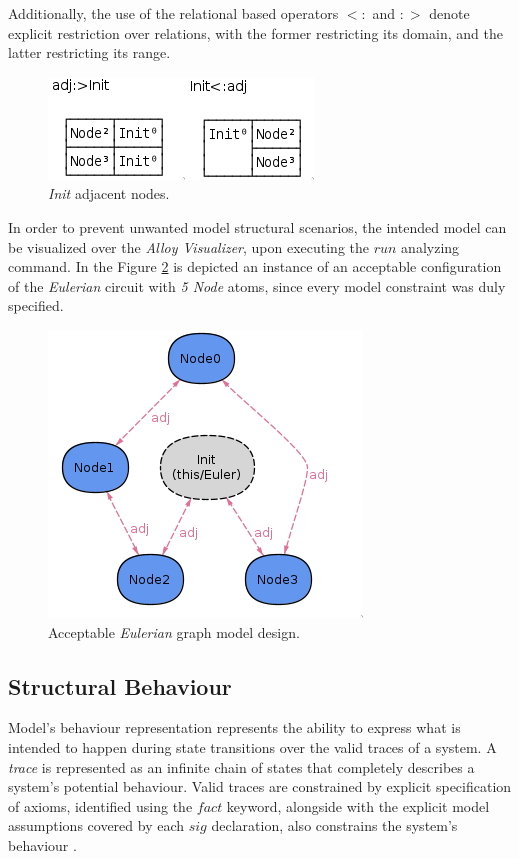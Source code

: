 Additionally, the use of the relational based operators $<:$ and $:>$ denote explicit restriction over relations, with the former restricting its domain, and the latter restricting its range.

\begin{figure}[H]
    \centering
    \includegraphics[width=0.4\linewidth]{img/alloy_evaluator2.png}
    \caption{\textit{Init} adjacent nodes.}
    \label{fig:alloy-evaluator_2}
\end{figure}


In order to prevent unwanted model structural scenarios, the intended model can be visualized over the \textit{Alloy Visualizer}, upon executing the $run$ analyzing command. In the Figure \ref{fig:alloy-eulerian_1} is depicted an instance of an acceptable configuration of the \textit{Eulerian} circuit with \textit{5 Node} atoms, since every model constraint was duly specified.

\begin{figure}[H]
    \centering
    \includegraphics[width=0.5\linewidth]{img/alloy_eulerian_1.png}
    \caption{Acceptable \textit{Eulerian} graph model design.}
    \label{fig:alloy-eulerian_1}
\end{figure}



\subsection{Structural Behaviour}

Model's behaviour representation represents the ability to express what is intended to happen during state transitions over the valid traces of a system. A \textit{trace} is represented as an infinite chain of states that completely describes a system's potential behaviour. Valid traces are constrained by explicit specification of axioms, identified using the $fact$ keyword, alongside with the explicit model assumptions covered by each $sig$ declaration, also constrains the system's behaviour \cite{gheyi2007formally}.

